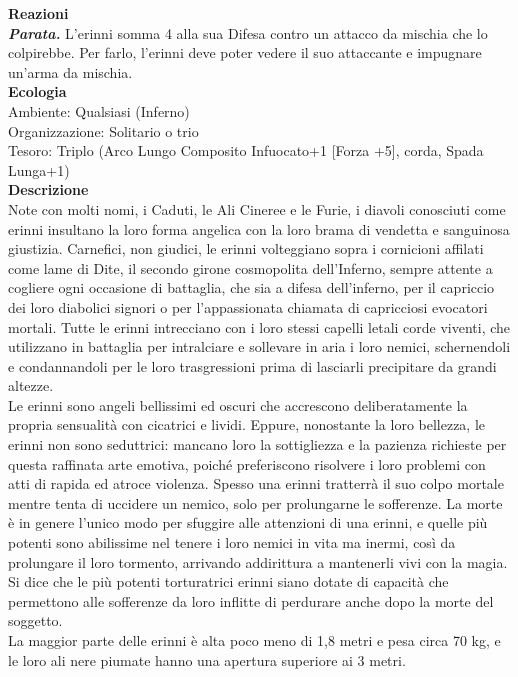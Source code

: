 \begin{multicols}{2}
\textbf{Reazioni}\\
\emph{\textbf{Parata.}} L'erinni somma 4 alla sua Difesa contro un attacco da mischia che lo colpirebbe. Per farlo, l'erinni deve poter vedere il suo attaccante e impugnare un'arma da mischia.\\
\textbf{Ecologia}\\
Ambiente: Qualsiasi (Inferno)\\
Organizzazione: Solitario o trio\\
Tesoro: Triplo (Arco Lungo Composito Infuocato+1 [Forza +5], corda, Spada Lunga+1)\\
\textbf{Descrizione}\\
Note con molti nomi, i Caduti, le Ali Cineree e le Furie, i diavoli conosciuti come erinni insultano la loro forma angelica con la loro brama di vendetta e sanguinosa giustizia. Carnefici, non giudici, le erinni volteggiano sopra i cornicioni affilati come lame di Dite, il secondo girone cosmopolita dell'Inferno, sempre attente a cogliere ogni occasione di battaglia, che sia a difesa dell'inferno, per il capriccio dei loro diabolici signori o per l'appassionata chiamata di capricciosi evocatori mortali. Tutte le erinni intrecciano con i loro stessi capelli letali corde viventi, che utilizzano in battaglia per intralciare e sollevare in aria i loro nemici, schernendoli e condannandoli per le loro trasgressioni prima di lasciarli precipitare da grandi altezze.\\
Le erinni sono angeli bellissimi ed oscuri che accrescono deliberatamente la propria sensualità con cicatrici e lividi. Eppure, nonostante la loro bellezza, le erinni non sono seduttrici: mancano loro la sottigliezza e la pazienza richieste per questa raffinata arte emotiva, poiché preferiscono risolvere i loro problemi con atti di rapida ed atroce violenza. Spesso una erinni tratterrà il suo colpo mortale mentre tenta di uccidere un nemico, solo per prolungarne le sofferenze. La morte è in genere l'unico modo per sfuggire alle attenzioni di una erinni, e quelle più potenti sono abilissime nel tenere i loro nemici in vita ma inermi, così da prolungare il loro tormento, arrivando addirittura a mantenerli vivi con la magia. Si dice che le più potenti torturatrici erinni siano dotate di capacità che permettono alle sofferenze da loro inflitte di perdurare anche dopo la morte del soggetto.\\
La maggior parte delle erinni è alta poco meno di 1,8 metri e pesa circa 70 kg, e le loro ali nere piumate hanno una apertura superiore ai 3 metri.\\


\end{multicols}
